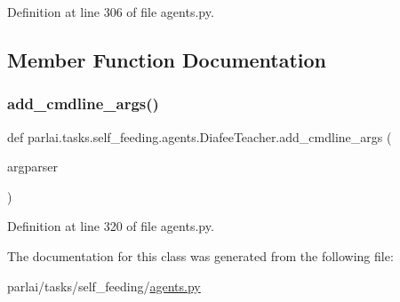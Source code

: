 Definition at line 306 of file agents.\+py.



\subsection{Member Function Documentation}
\mbox{\label{classparlai_1_1tasks_1_1self__feeding_1_1agents_1_1DiafeeTeacher_aab781156a05d1046b153df4920d4ce6b}} 
\subsubsection{\texorpdfstring{add\+\_\+cmdline\+\_\+args()}{add\_cmdline\_args()}}
{\footnotesize\ttfamily def parlai.\+tasks.\+self\+\_\+feeding.\+agents.\+Diafee\+Teacher.\+add\+\_\+cmdline\+\_\+args (\begin{DoxyParamCaption}\item[{}]{argparser }\end{DoxyParamCaption})\hspace{0.3cm}{\ttfamily [static]}}



Definition at line 320 of file agents.\+py.



The documentation for this class was generated from the following file\+:\begin{DoxyCompactItemize}
\item 
parlai/tasks/self\+\_\+feeding/\hyperlink{parlai_2tasks_2self__feeding_2agents_8py}{agents.\+py}\end{DoxyCompactItemize}
